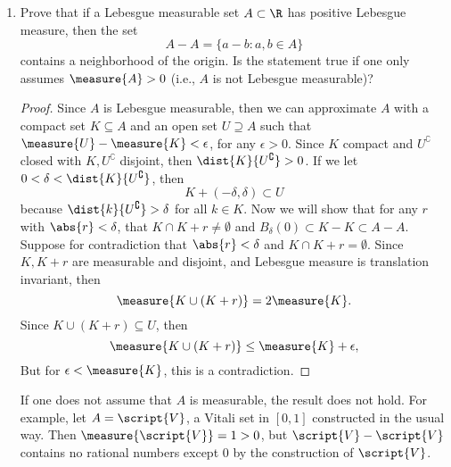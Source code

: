 \documentclass[12pt,letterpaper]{article}
\begin{document}
\begin{enumerate}[resume]
\item Prove that if a Lebesgue measurable set $A\subset\R$ has positive Lebesgue measure, then the set 
$$A-A=\{a-b:a,b\in A\}$$
contains a neighborhood of the origin. Is the statement true if one only assumes $\measure{A} > 0$ (i.e., $A$ is not Lebesgue measurable)?
\begin{proof}
Since $A$ is Lebesgue measurable, then we can approximate $A$ with a compact set $K\subseteq A$ and an open set $U\supseteq A$ such that $\measure{U}-\measure{K}<\epsilon$, for any $\epsilon>0$. Since $K$ compact and $U^\complement$ closed with $K, U^\complement$ disjoint, then $\dist{K}{U^\complement}>0$. If we let $0<\delta<\dist{K}{U^\complement}$, then 
$$K+(-\delta,\delta)\subset U$$
because $\dist{k}{U^\complement}>\delta$ for all $k\in K$. Now we will show that for any $r$ with $\abs{r}<\delta$, that $K\cap K+r\neq\emptyset$ and $B_\delta(0)\subset K-K \subset A-A$. Suppose for contradiction that $\abs{r}<\delta$ and $K\cap K+r=\emptyset$. Since $K,K+r$ are measurable and disjoint, and Lebesgue measure is translation invariant, then 
$$\measure{K\cup(K+r)}=2\measure{K}.$$
Since $K\cup(K+r)\subseteq U$, then 
$$\measure{K\cup(K+r)}\leq\measure{K}+\epsilon,$$
But for $\epsilon<\measure{K}$, this is a contradiction. 
\end{proof}
\answer If one does not assume that $A$ is measurable, the result does not hold. For example, let $A=\script{V}$, a Vitali set in $[0,1]$ constructed in the usual way. Then $\measure{\script{V}}=1>0$,  but $\script{V}-\script{V}$ contains no rational numbers except 0 by the construction of $\script{V}$. 
\end{enumerate}
\end{document}
